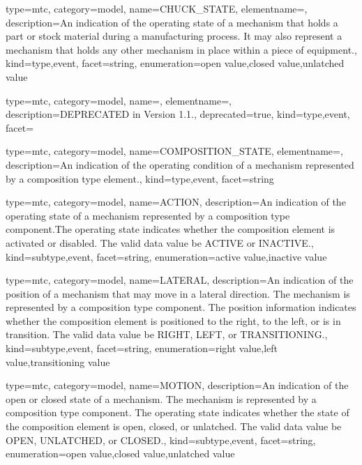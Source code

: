 {
  type=mtc,
  category=model,
  name={CHUCK\_STATE},
  elementname=,
  description={An indication of the operating state of a mechanism that holds a part or stock material during a manufacturing process. It may also represent a mechanism that holds any other mechanism in place within a piece of equipment.},
  kind={type,event},
  facet={\gls{string}},
  enumeration={\gls{open value},\gls{closed value},\gls{unlatched value}}
}


{
  type=mtc,
  category=model,
  name=,
  elementname=,
  description={DEPRECATED in Version 1.1.},
  deprecated={true},
  kind={type,event},
  facet={}
}


{
  type=mtc,
  category=model,
  name={COMPOSITION\_STATE},
  elementname=,
  description={An indication of the operating condition of a mechanism represented by a \gls{composition} type element.},
  kind={type,event},
  facet={\gls{string}}
}


{
  type=mtc,
  category=model,
  name={ACTION},
  description={An indication of the operating state of a mechanism represented by a \gls{composition} type component.The operating state indicates whether the \gls{composition} element is activated or disabled. The \gls{valid data value} \must be ACTIVE or INACTIVE.},
  kind={subtype,event},
  facet={\gls{string}},
  enumeration={\gls{active value},\gls{inactive value}}
}


{
  type=mtc,
  category=model,
  name={LATERAL},
  description={An indication of the position of a mechanism that may move in a lateral direction.   The mechanism is represented by a \gls{composition} type component. \newline The position information indicates whether the \gls{composition} element is positioned to the right, to the left, or is in transition.  \newline The \gls{valid data value} \must be RIGHT, LEFT, or TRANSITIONING.},
  kind={subtype,event},
  facet={\gls{string}},
  enumeration={\gls{right value},\gls{left value},\gls{transitioning value}}
}


{
  type=mtc,
  category=model,
  name={MOTION},
  description={An indication of the open or closed state of a mechanism.   The mechanism is represented by a \gls{composition} type component. \newline The operating state indicates whether the state of the \gls{composition} element is open, closed, or unlatched.   \newline The \gls{valid data value} \must be OPEN, UNLATCHED, or CLOSED.},
  kind={subtype,event},
  facet={\gls{string}},
  enumeration={\gls{open value},\gls{closed value},\gls{unlatched value}}
}


